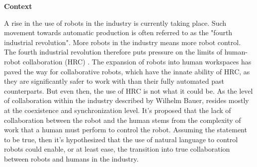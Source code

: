 
\textbf{\Large{Context}}

A rise in the use of robots in the industry is currently taking place. Such 
movement towards automatic production is often referred to 
as the "fourth industrial revolution". More robots in the industry means 
more robot control. The fourth industrial revolution therefore puts 
pressure on the limits of human-robot collaboration (HRC)
\cite{4_0_Industrial_revolution}.
The expansion of robots into human workspaces has paved the way
for collaborative robots, which have the innate ability of HRC, as they are
significantly safer to work with than their fully 
automated past counterparts\cite{cobots}.
But even then, the use of HRC is not what it could be. As the 
level of collaboration within the industry described by Wilhelm Bauer, 
resides mostly at the coexistence and synchronization 
level\cite{HRC_levels}.
It's proposed that the lack of collaboration between the 
robot and the human stems from the complexity of work that a human
must perform to control the robot. Assuming the statement to be true,
then it's hypothesized that the use of natural language to control robots 
could enable, or at least ease, the transition into 
true collaboration between robots and humans in the industry. 



